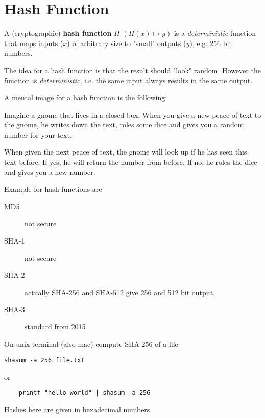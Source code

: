 
\section{Hash Function}


\begin{definition}
	A (cryptographic) \textbf{hash function} $H$ $(H(x) \mapsto y)$ is a \emph{deterministic} function that maps inputs ($x$) of arbitrary size to "small" outputs ($y$), e.g. 256 bit numbers.
\end{definition}
 
\begin{note}
The idea for a hash function is that the result should "look" random. 
However the function is \emph{deterministic}, i.e. the same input always results in the same output.
\end{note}

\begin{note}
A mental image for a hash function is the following:

Imagine a gnome that lives in a closed box. When you give a new peace of text to the gnome, he writes down the text, roles some dice and gives you a random number for your text.

When given the next peace of text, the gnome will look up if he has seen this text before. If yes, he will return the number from before. If no, he roles the dice and gives you a new number.
\end{note}

\begin{example}
Example for hash functions are

\begin{description}
	\item[MD5] not secure
	\item[SHA-1] not secure
	\item[SHA-2] actually SHA-256 and SHA-512 give 256 and 512 bit output.
	\item[SHA-3] standard from 2015
\end{description}

On unix terminal (also mac) compute SHA-256 of a file
\begin{verbatim}
shasum -a 256 file.txt	
\end{verbatim}
or
\begin{verbatim}
	printf "hello world" | shasum -a 256
\end{verbatim}
Hashes here are given in hexadecimal numbers.
\end{example}


